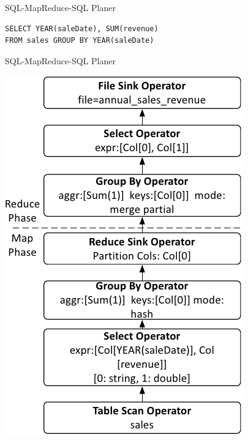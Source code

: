 \documentclass{beamer}
\begin{document}
\begin{frame}[fragile]{SQL-MapReduce-SQL Planer}
\begin{verbatim}
SELECT YEAR(saleDate), SUM(revenue)
FROM sales GROUP BY YEAR(saleDate)
\end{verbatim}
\end{frame}

\begin{frame}{SQL-MapReduce-SQL Planer}
  \begin{center}
    \includegraphics[height=0.8\textheight]{../ausarbeitung/images/hadoopdb-reduce-map-phase_a.png}    
  \end{center}
\end{frame}
\end{document}
